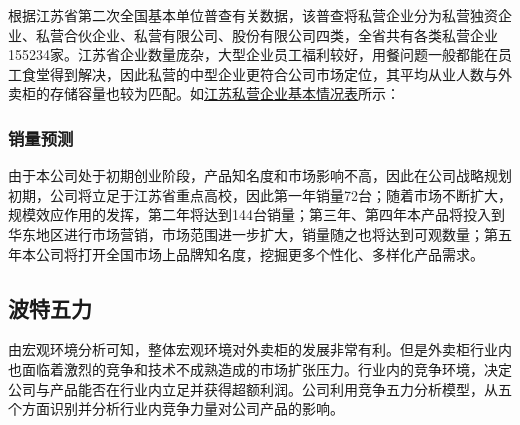 \documentclass[violet]{main}
\begin{document}
					\par 根据江苏省第二次全国基本单位普查有关数据，该普查将私营企业分为私营独资企业、私营合伙企业、私营有限公司、股份有限公司四类，全省共有各类私营企业155234家。江苏省企业数量庞杂，大型企业员工福利较好，用餐问题一般都能在员工食堂得到解决，因此私营的中型企业更符合公司市场定位，其平均从业人数与外卖柜的存储容量也较为匹配。如\hyperlink{江苏私营企业基本情况表}{江苏私营企业基本情况表}所示：
					\begin{center}
						\Tcbset{}
					\end{center}
		\subsubsection{销量预测}
			由于本公司处于初期创业阶段，产品知名度和市场影响不高，因此在公司战略规划初期，公司将立足于江苏省重点高校，因此第一年销量72台；随着市场不断扩大，规模效应作用的发挥，第二年将达到144台销量；第三年、第四年本产品将投入到华东地区进行市场营销，市场范围进一步扩大，销量随之也将达到可观数量；第五年本公司将打开全国市场上品牌知名度，挖掘更多个性化、多样化产品需求。
			\begin{center}
				\Tcbset{}
			\end{center}
		\subsection{波特五力}
			由宏观环境分析可知，整体宏观环境对外卖柜的发展非常有利。但是外卖柜行业内也面临着激烈的竞争和技术不成熟造成的市场扩张压力。行业内的竞争环境，决定公司与产品能否在行业内立足并获得超额利润。公司利用竞争五力分析模型，从五个方面识别并分析行业内竞争力量对公司产品的影响。
\end{document}
